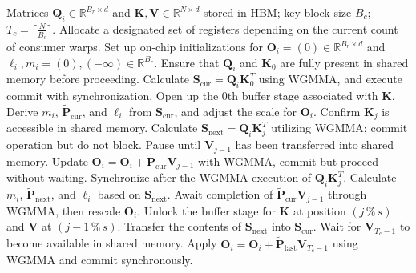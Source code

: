 \begin{enumerate}
\begin{algorithm}[H]
    \caption{\small\label{alg:flash3_wgmma}\textsc{FlashAttention-3} consumer warpgroup forward pass}
    \begin{algorithmic}[1]
      \REQUIRE  Matrices $\mathbf{Q}_i \in \mathbb{R}^{B_r \times d}$ and $\mathbf{K}, \mathbf{V} \in \mathbb{R}^{N \times d}$ stored in HBM; key block size $B_c$; $T_c = \lceil \frac{N}{B_c} \rceil$.
      \STATE Allocate a designated set of registers depending on the current count of consumer warps.
      \STATE Set up on-chip initializations for $\mathbf{O}_i = (0) \in \mathbb{R}^{B_r \times d}$ and $\ell_i, m_i = (0), (-\infty) \in \mathbb{R}^{B_r}$.
      \STATE Ensure that $\mathbf{Q}_i$ and $\mathbf{K}_0$ are fully present in shared memory before proceeding.
      \STATE Calculate $\mathbf{S}_{\mathrm{cur}} = \mathbf{Q}_i \mathbf{K}_0^T$ using WGMMA, and execute commit with synchronization.
      \STATE Open up the $0$th buffer stage associated with $\mathbf{K}$.
      \STATE Derive $m_{i}$, $\tilde{\mathbf{P}}_{\mathrm{cur}}$, and $\ell_{i}$ from $\mathbf{S}_{\mathrm{cur}}$, and adjust the scale for $\mathbf{O}_i$.
        \STATE Confirm $\mathbf{K}_j$ is accessible in shared memory.
        \label{code:mainloop_start}
        \STATE Calculate $\mathbf{S}_{\mathrm{next}} = \mathbf{Q}_i \mathbf{K}_{j}^T$ utilizing WGMMA; commit operation but do not block.
        \label{code:first_wgmma}
        \STATE Pause until $\mathbf{V}_{j-1}$ has been transferred into shared memory.
        \STATE Update $\mathbf{O}_{i} = \mathbf{O}_{i} + \tilde{\mathbf{P}}_{\mathrm{cur}} \mathbf{V}_{j-1}$ with WGMMA, commit but proceed without waiting.
        \label{code:second_wgmma}
        \STATE Synchronize after the WGMMA execution of $\mathbf{Q}_i \mathbf{K}_{j}^T$.
        \STATE Calculate $m_{i}$, $\tilde{\mathbf{P}}_{\mathrm{next}}$, and $\ell_{i}$ based on $\mathbf{S}_{\mathrm{next}}$. 
        \label{code:softmax}
        \STATE Await completion of $\tilde{\mathbf{P}}_{\mathrm{cur}} \mathbf{V}_{j-1}$ through WGMMA, then rescale $\mathbf{O}_i$.
        \STATE Unlock the buffer stage for $\mathbf{K}$ at position $(j\,\%\,s)$ and $\mathbf{V}$ at $(j-1\,\%\,s)$.
        \STATE Transfer the contents of $\mathbf{S}_{\mathrm{next}}$ into $\mathbf{S}_{\mathrm{cur}}$.
        \label{code:mainloop_end}
      \ENDFOR \STATE Wait for $\mathbf{V}_{T_c - 1}$ to become available in shared memory.
      \STATE Apply
      $\mathbf{O}_{i} = \mathbf{O}_{i} + \tilde{\mathbf{P}}_{\mathrm{last}} \mathbf{V}_{T_c - 1}$ using WGMMA and commit synchronously.


\end{algorithmic}
\end{algorithm}
\end{enumerate}
